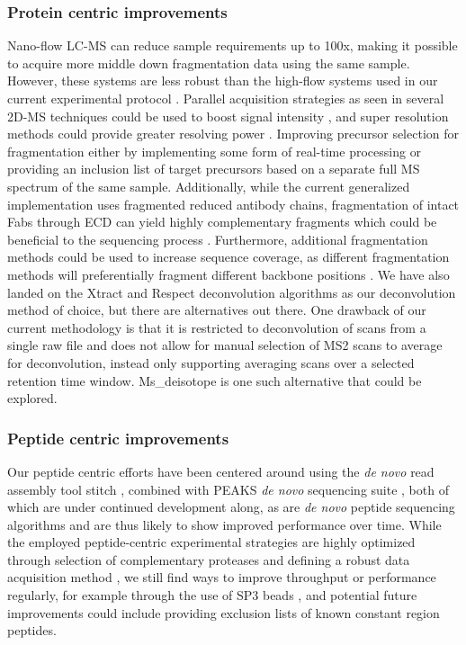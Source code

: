 \subsubsection{Protein centric improvements}
Nano-flow LC-MS can reduce sample requirements up to 100x, making it possible to acquire more middle down fragmentation data using the same sample. However, these systems are less robust than the high-flow systems used in our current experimental protocol \cite{wilm1996analytical, gatlin1998protein}. Parallel acquisition strategies as seen in several 2D-MS techniques could be used to boost signal intensity \cite{vasilopoulou2020trapped, ridgeway2018trapped, graham2023characterizing}, and super resolution methods could provide greater resolving power \cite{grinfeld2017phase-constrained}. Improving precursor selection for fragmentation either by implementing some form of real-time processing \cite{jeong2022flashida} or providing an inclusion list of target precursors based on a separate full MS spectrum of the same sample. Additionally, while the current generalized implementation uses fragmented reduced antibody chains, fragmentation of intact Fabs through ECD can yield highly complementary fragments which could be beneficial to the sequencing process \cite{boer2020selectivity}. Furthermore, additional fragmentation methods could be used to increase sequence coverage, as different fragmentation methods will preferentially fragment different backbone positions \cite{dupré2021de, brodbelt2016ion}. We have also landed on the Xtract and Respect deconvolution algorithms as our deconvolution method of choice, but there are alternatives out there. One drawback of our current methodology is that it is restricted to deconvolution of scans from a single raw file and does not allow for manual selection of MS2 scans to average for deconvolution, instead only supporting averaging scans over a selected retention time window. Ms\_deisotope \cite{klein2021mobiusklein/msdeisotope:} is one such alternative that could be explored.

\subsubsection{Peptide centric improvements}
Our peptide centric efforts have been centered around using the \emph{de novo} read assembly tool stitch \cite{schulte2022template-based}, combined with PEAKS \emph{de novo} sequencing suite \cite{ma2003peaks:}, both of which are under continued development along, as are \emph{de novo} peptide sequencing algorithms and are thus likely to show improved performance over time. While the employed peptide-centric experimental strategies are highly optimized through selection of complementary proteases and defining a robust data acquisition method \cite{peng2021mass}, we still find ways to improve throughput or performance regularly, for example through the use of SP3 beads \cite{johnston2022solvent}, and potential future improvements could include providing exclusion lists of known constant region peptides.

